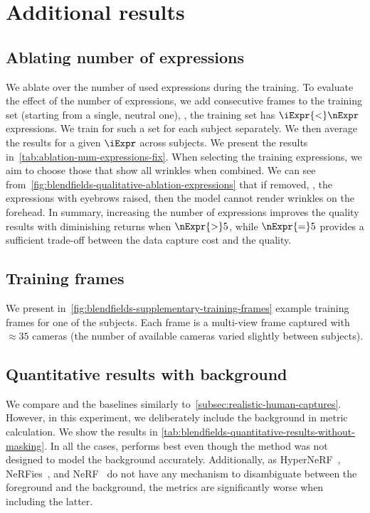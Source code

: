   
\section{Additional results}
  \subsection{Ablating number of expressions}
    We ablate over the number of used expressions during the training.
    To evaluate the effect of the number of expressions, we add consecutive
    frames to the training set (starting from a single, neutral one), \ie, the
    training set has $\iExpr{<}\nExpr$ expressions.
    We train \blendfields for such a set for each subject separately.
    We then average the results for a given $\iExpr$ across subjects.
    We present the results in~\cref{tab:ablation-num-expressions-fix}.
    When selecting the training expressions, we aim to choose those that show
    all wrinkles when combined.
    We can see from~\cref{fig:blendfields-qualitative-ablation-expressions}
    that if removed, \eg, the expressions with eyebrows raised, then the model
    cannot render wrinkles on the forehead.
    In summary, increasing the number of expressions improves the quality
    results with diminishing returns when $\nExpr{>}5$, while $\nExpr{=}5$
    provides a sufficient trade-off between the data capture cost and the
    quality.

    
  \subsection{Training frames}
    We present in~\cref{fig:blendfields-supplementary-training-frames} example
    training frames for one of the subjects.
    Each frame is a multi-view frame captured with ${\approx} 35$ cameras (the
    number of available cameras varied slightly between subjects).

    
  \subsection{Quantitative results with background}
    We compare \blendfields and the baselines similarly
    to~\cref{subsec:realistic-human-captures}.
    However, in this experiment, we deliberately include the background in
    metric calculation.
    We show the results in
    \cref{tab:blendfields-quantitative-results-without-masking}.
    In all the cases, \blendfields performs best even though the method was
    not designed to model the background accurately.
    Additionally, as HyperNeRF~\cite{park2021hypernerf},
    NeRFies~\cite{park2021nerfies}, and NeRF~\cite{mildenhall2020nerf} do not
    have any mechanism to disambiguate between the foreground and the
    background, the metrics are significantly worse when including the latter.


